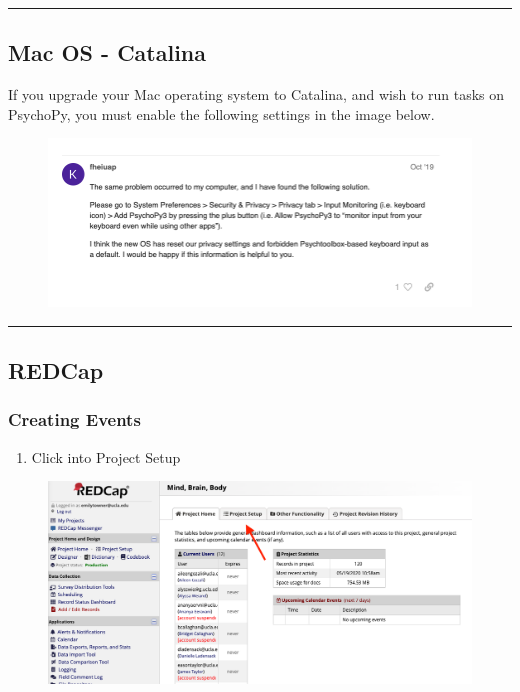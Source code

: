 \documentclass[]{book}
\providecommand{\tightlist}{%
  \setlength{\itemsep}{0pt}\setlength{\parskip}{0pt}}
\begin{document}
\begin{center}\rule{0.5\linewidth}{0.5pt}\end{center}

\hypertarget{mac-os---catalina}{%
\subsection{Mac OS - Catalina}\label{mac-os---catalina}}

If you upgrade your Mac operating system to Catalina, and wish to run tasks on PsychoPy, you must enable the following settings in the image below.

\begin{figure}
\centering
\includegraphics{images/lab_protocols/catalina/1.png}
\caption{}
\end{figure}

\begin{center}\rule{0.5\linewidth}{0.5pt}\end{center}

\hypertarget{redcap}{%
\subsection{REDCap}\label{redcap}}

\hypertarget{creating-events}{%
\subsubsection{Creating Events}\label{creating-events}}

\begin{enumerate}
\def\labelenumi{\arabic{enumi}.}
\tightlist
\item
  Click into Project Setup
\end{enumerate}

\begin{figure}
\centering
\includegraphics{images/lab_protocols/redcap/2.png}
\caption{}
\end{figure}
\end{document}
